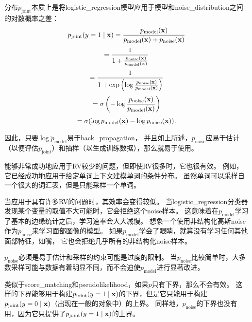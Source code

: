 分布$p_{\text{joint}}$本质上是将\gls{logistic_regression}模型应用于模型和\gls{noise_distribution}之间的对数概率之差：
\begin{equation}
	p_{\text{joint}} (y = 1 \mid \mathbf{x}) = \frac{ p_{\text{model}}(\mathbf{x}) }{ p_{\text{model}}(\mathbf{x}) + p_{\text{noise}}(\mathbf{x}) }
\end{equation}
\begin{equation}
 = \frac{1}{1 + \frac{ p_{\text{noise}}(\mathbf{x}) }{ p_{\text{model}}(\mathbf{x}) }}
\end{equation}
\begin{equation}
= \frac{1}{1 + \exp \left( \log \frac{ p_{\text{noise}}(\mathbf{x}) }{ p_{\text{model}}(\mathbf{x}) } \right)}
\end{equation}
\begin{equation}
	= \sigma \left( - \log \frac{ p_{\text{noise}} (\mathbf{x}) }{ p_{\text{model}} (\mathbf{x}) } \right)
\end{equation}
\begin{equation}
	= \sigma ( \log p_{\text{model}} (\mathbf{x}) - \log p_{\text{noise}} (\mathbf{x})  ) .
\end{equation}


因此，只要$\log \tilde{p}_{\text{model}}$易于\gls{back_propagation}，
并且如上所述，$p_{\text{noise}}$应易于估计（以便评估$p_{\text{joint}}$）和抽样（以生成训练数据），那么就易于使用。


能够非常成功地应用于\gls{RV}较少的问题，但即使\gls{RV}很多时，它也很有效。
例如，它已经成功地应用于给定单词上下文建模单词的条件分布\citep{Mnih2013}。
虽然单词可以采样自一个很大的词汇表，但是只能采样一个单词。


当应用于具有许多\gls{RV}的问题时，其效率会变得较低。
当\gls{logistic_regression}分类器发现某个变量的取值不大可能时，它会拒绝这个\gls{noise}样本。
这意味着在$p_{\text{model}}$学习了基本的边缘统计之后，学习速率会大大减慢。
想象一个使用非结构化高斯\gls{noise}作为$p_{\text{noise}}$来学习面部图像的模型。
如果$p_{\text{model}}$学会了眼睛，就算没有学习任何其他面部特征，如嘴， 它也会拒绝几乎所有的非结构化\gls{noise}样本。


$p_{\text{noise}}$必须是易于估计和采样的约束可能是过度的限制。
当$p_{\text{noise}}$比较简单时，大多数采样可能与数据有着明显不同，而不会迫使$p_{\text{model}}$进行显著改进。


类似于\gls{score_matching}和\gls{pseudolikelihood}，如果$p$只有下界，那么不会有效。
这样的下界能够用于构建$p_{\text{joint}}( y = 1 \mid \mathbf{x})$的下界，但是它只能用于构建$p_{\text{joint}}(y = 0 \mid \mathbf{x})$（出现在一般的对象中）的上界。
同样地，$p_{\text{noise}}$的下界也没有用，因为它只提供了$p_{\text{joint}}( y = 1 \mid \mathbf{x})$的上界。


